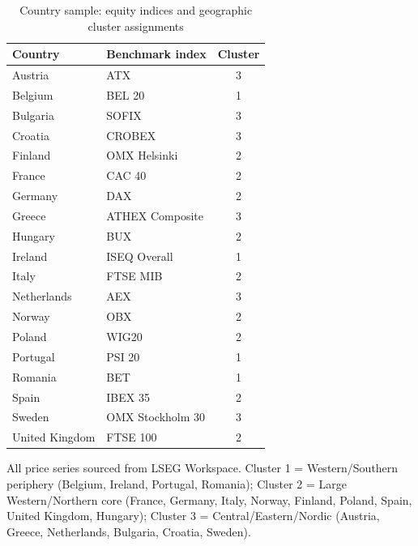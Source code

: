 \documentclass[11pt]{article}
\begin{document}
\begin{table}[ht]
\centering
\small
\begin{threeparttable}
\caption{Country sample: equity indices and geographic cluster assignments}
\label{tab:app_countries}
\begin{tabular}{llc}
\hline\hline
Country & Benchmark index & Cluster \\
\hline
Austria        & ATX               & 3 \\
Belgium        & BEL 20            & 1 \\
Bulgaria       & SOFIX             & 3 \\
Croatia        & CROBEX            & 3 \\
Finland        & OMX Helsinki      & 2 \\
France         & CAC 40            & 2 \\
Germany        & DAX               & 2 \\
Greece         & ATHEX Composite   & 3 \\
Hungary        & BUX               & 2 \\
Ireland        & ISEQ Overall      & 1 \\
Italy          & FTSE MIB          & 2 \\
Netherlands    & AEX               & 3 \\
Norway         & OBX               & 2 \\
Poland         & WIG20             & 2 \\
Portugal       & PSI 20            & 1 \\
Romania        & BET               & 1 \\
Spain          & IBEX 35           & 2 \\
Sweden         & OMX Stockholm 30  & 3 \\
United Kingdom & FTSE 100          & 2 \\
\hline\hline
\end{tabular}
\begin{tablenotes}
\small
\item All price series sourced from LSEG Workspace.
      Cluster 1 = Western/Southern periphery (Belgium, Ireland, Portugal, Romania);
      Cluster 2 = Large Western/Northern core (France, Germany, Italy, Norway, Finland,
      Poland, Spain, United Kingdom, Hungary);
      Cluster 3 = Central/Eastern/Nordic (Austria, Greece, Netherlands, Bulgaria, Croatia, Sweden).
\end{tablenotes}
\end{threeparttable}
\end{table}
\end{document}
